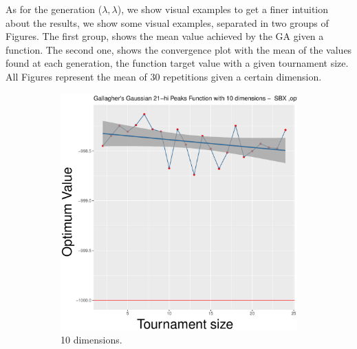 As for the generation ($\lambda, \lambda$), we show visual examples to get a finer intuition about the results, we show  some visual examples, separated in two groups of Figures. The first group, shows the mean value achieved by the GA given a function. The second one, shows the convergence plot with the mean of the values found at each generation, the function target value with a given tournament size. All Figures represent the mean of 30 repetitions given a certain dimension.


\begin{figure}[t]
	\begin{subfigure}[b]{0.33\textwidth}
		\centering
		\includegraphics[width=\textwidth]{img/2n2n-10D/multimodal_2n2n_22_dim_10.pdf}
		\caption{10 dimensions.}
	\end{subfigure}
	\begin{subfigure}[b]{0.33\textwidth}
		\centering

\end{subfigure}
\end{figure}

